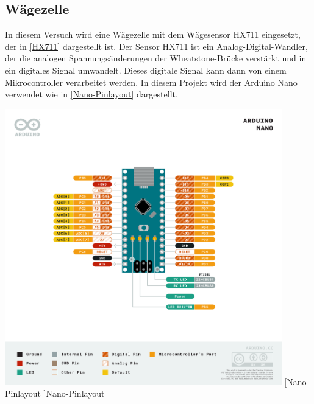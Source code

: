 \subsection{Wägezelle}

In diesem Versuch wird eine Wägezelle mit dem Wägesensor HX711 eingesetzt, der in \autoref{HX711} dargestellt ist.
Der Sensor HX711 ist ein Analog-Digital-Wandler, der die analogen Spannungsänderungen der Wheatstone-Brücke verstärkt und in ein digitales Signal umwandelt.
Dieses digitale Signal kann dann von einem Mikrocontroller verarbeitet werden.
In diesem Projekt wird der Arduino Nano verwendet wie in \autoref{Nano-Pinlayout} dargestellt. \\
\begin{center}
    \centering
    \includegraphics[width=0.9\textwidth]{img/Nano-Pinlayout.png}
    [Nano-Pinlayout ]{Nano-Pinlayout \cite{Arduino}}\label{Nano-Pinlayout}
\end{center}

